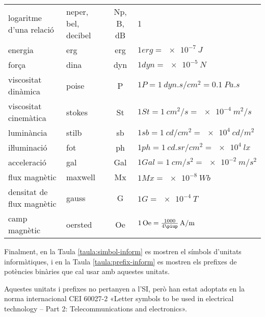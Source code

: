 \begin{ThreePartTable}
\begin{longtable}[h]{llcl}
    logaritme d'una relació & neper, bel, decibel\tnote{c} & \si{Np}, \si{B}, \si{dB} & 1\\
    energia & erg & \si{erg} & $1\unit{erg} = \SI{e-7}{J} $ \\
    força & dina & \si{dyn} & $1\unit{dyn} = \SI{e-5}{N}$ \\
    viscositat dinàmica & poise & \si{P} & $1\unit{P} = \SI{1}{dyn.s/cm^2} = \SI{0,1}{Pa.s}$ \\
    viscositat cinemàtica & stokes & \si{St} & $1\unit{St} = \SI{1}{cm^2/s} = \SI{e-4}{m^2/s}$ \\
    luminància & stilb & \si{sb} & $1\unit{sb} = \SI{1}{cd/cm^2} = \SI{e4}{cd/m^2}$ \\
    iŀluminació & fot & \si{ph} & $1\unit{ph} = \SI{1}{cd.sr/cm^2} = \SI{e4}{lx}$ \\
    acceleració & gal & \si{Gal} & $1\unit{Gal} = \SI{1}{cm/s^2} = \SI{e-2}{m/s^2}$ \\
    flux magnètic & maxwell & \si{Mx} & $1\unit{Mx} = \SI{e-8}{Wb}$ \\
    densitat de flux magnètic & gauss & \si{G} & $1\unit{G} = \SI{e-4}{T}$ \\
    camp magnètic & oersted & \si{Oe} & $1\unit{Oe} = \frac{1000}{4\piup}\unit{A/m}$ \\
\bottomrule[1pt]
\end{longtable}
\end{ThreePartTable}


Finalment, en la Taula \vref{taula:simbol-inform} es mostren el símbols d'unitats informàtiques,  i en la Taula \vref{taula:prefix-inform} es mostren els prefixes de potències binàries que cal usar amb aquestes unitats.

Aquestes unitats i prefixes no pertanyen a l'SI, però han estat adoptats en la norma internacional CEI 60027-2 «Letter symbols to be used in electrical technology -- Part 2: Telecommunications and electronics».

